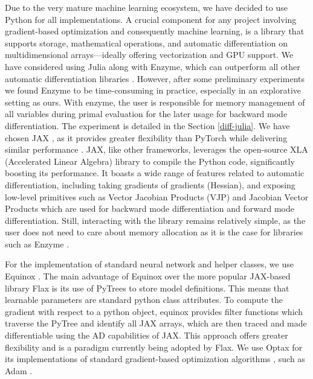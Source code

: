 \documentclass{article}
\begin{document}
Due to the very mature machine learning ecosystem, we have decided to use Python for all implementations. A crucial component for any project involving gradient-based optimization and consequently machine learning, is a library that supports storage, mathematical operations, and automatic differentiation on multidimensional arrays—ideally offering vectorization and GPU support. We have considered using Julia along with Enzyme, which can outperform all other automatic differentiation libraries  \citep{enzyme1, enzyme2, enzyme3}. However, after some preliminary experiments we found Enzyme to be time-consuming in practice, especially in an explorative setting as ours. With enzyme, the user is responsible for memory management of all variables during primal evaluation for the later usage for backward mode differentiation. The experiment is detailed in the Section \ref{diff-julia}.  
We have chosen {JAX} \citep{jax2018github}, as it provides greater flexibility than PyTorch while delivering similar performance \citep{dion_hafner_2021_5607491}. JAX, like other frameworks, leverages the open-source XLA (Accelerated Linear Algebra) library to compile the Python code, significantly boosting its performance. It boasts a wide range of features related to automatic differentiation, including taking gradients of gradients (Hessian), and exposing low-level primitives such as Vector Jacobian Products (VJP) and Jacobian Vector Products which are used for backward mode differentiation and forward mode differentiation. Still, interacting with the library remains relatively simple, as the user does not need to care about memory allocation as it is the case for libraries such as Enzyme \citep{NEURIPS2020_9332c513}.

For the implementation of standard neural network and helper classes, we use Equinox \citep{kidger2021equinox}. The main advantage of Equinox over the more popular JAX-based library Flax \citep{flax2020github} is its use of PyTrees to store model definitions. This means that learnable parameters are standard python class attributes. To compute the gradient with respect to a python object, equinox provides filter functions which traverse the PyTree and identify all {JAX} arrays, which are then traced and made differentiable using the AD capabilities of JAX. This approach offers greater flexibility and is a paradigm currently being adopted by Flax. We use Optax for its implementations of standard gradient-based optimization algorithms \citep{deepmind2020jax}, such as Adam \citep{kingma2014adam}.
\end{document}
